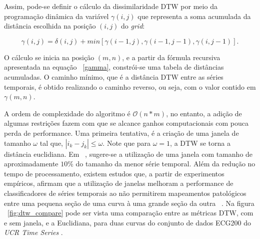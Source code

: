 Assim, pode-se definir o cálculo da dissimilaridade DTW por meio da programação dinâmica da variável $\gamma(i,j)$ que representa a soma acumulada da distância escolhida na posição $(i,j)$ do \emph{grid}:

\begin{equation} \label{gamma}
\gamma(i,j) = \delta(i,j) + min[\gamma(i-1,j),\gamma(i-1,j-1),\gamma(i,j-1)].
\end{equation}

O cálculo se inicia na posição $(m,n)$, e a partir da fórmula recursiva apresentada na equação ~\ref{gamma}, constrói-se uma tabela de distâncias acumuladas. O caminho mínimo, que é a distância DTW entre as séries temporais, é obtido realizando o caminho reverso, ou seja, com o valor contido em $\gamma(m,n)$.

A ordem de complexidade do algoritmo é $\mathcal{O}(n*m)$, no entanto, a adição de algumas restrições fazem com que se alcance ganhos computacionais com pouca perda de performance. Uma primeira tentativa, é a criação de uma janela de tamanho $\omega$ tal que, $|i_k-j_k| \leq \omega$. Note que para $\omega=1$, a DTW se torna a distância euclidiana. Em ~\parencite{BatistaComparativo}, sugere-se a utilização de uma janela com tamanho de aproximadamente $10\%$ do tamanho da menor série temporal. Além da redução no tempo de processamento, existem estudos que, a partir de experimentos empíricos, afirmam que a utilização de janelas melhoram a performance de classificadores de séries temporais ao não permitirem mapeamentos patológicos entre uma pequena seção de uma curva à uma grande seção da outra ~\parencite{LB_Keogh}. Na figura ~\ref{fig:dtw_compare} pode ser vista uma comparação entre as métricas DTW, com e sem janela, e a Euclidiana, para duas curvas do conjunto de dados ECG200 do \emph{UCR Time Series} \parencite{UCRArchive}.

